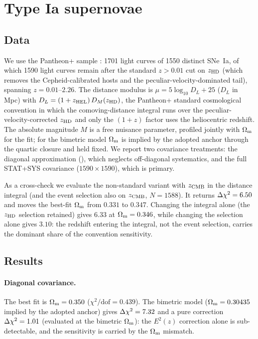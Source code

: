 \section{Type Ia supernovae}\label{sec:sne}

\subsection{Data}
We use the Pantheon+ sample \citep{Brout2022,Scolnic2022}: 1701 light curves of 1550 distinct SNe~Ia, of which 1590 light curves remain after the standard $z>0.01$ cut on $z_{\rm HD}$ (which removes the Cepheid-calibrated hosts and the peculiar-velocity-dominated tail), spanning $z=0.01$--$2.26$.
The distance modulus is $\mu=5\log_{10}D_L+25$ ($D_L$ in Mpc) with $D_L=(1+z_{\rm HEL})\,D_M(z_{\rm HD})$, the Pantheon+ standard cosmological convention in which the comoving-distance integral runs over the peculiar-velocity-corrected $z_{\rm HD}$ and only the $(1+z)$ factor uses the heliocentric redshift. The absolute magnitude $M$ is a free nuisance parameter, profiled jointly with $\Omega_{\mathrm m}$ for the \LCDM{} fit; for the bimetric model $\Omega_{\mathrm m}$ is implied by the adopted anchor through the quartic closure and held fixed.
We report two covariance treatments: the diagonal approximation (), which neglects off-diagonal systematics, and the full STAT+SYS covariance ($1590\times1590$), which is primary.

As a cross-check we evaluate the non-standard variant with $z_{\rm CMB}$ in the distance integral (and the event selection also on $z_{\rm CMB}$, $N=1588$). It returns $\Delta\chi^2=6.50$ and moves the \LCDM{} best-fit $\Omega_{\mathrm m}$ from $0.331$ to $0.347$. Changing the integral alone (the $z_{\rm HD}$ selection retained) gives $6.33$ at $\Omega_{\mathrm m}=0.346$, while changing the selection alone gives $3.10$: the redshift entering the integral, not the event selection, carries the dominant share of the convention sensitivity.

\subsection{Results}\label{sec:sneres}
\paragraph{Diagonal covariance.} The \LCDM{} best fit is $\Omega_{\mathrm m}=0.350$ ($\chi^2/\mathrm{dof}=0.439$). The bimetric model ($\Omega_{\mathrm m}=0.30435$ implied by the adopted anchor) gives $\Delta\chi^2=7.32$ and a pure correction $\Delta\chi^2=1.01$ (evaluated at the bimetric $\Omega_{\mathrm m}$): the $E^2(z)$ correction alone is sub-detectable, and the sensitivity is carried by the $\Omega_{\mathrm m}$ mismatch.

